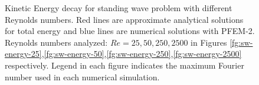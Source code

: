 \begin{figure}[h]
{    }
   \caption{Kinetic Energy decay for standing wave problem with different Reynolds numbers. Red lines are approximate analytical solutions for total energy and blue lines are numerical solutions with PFEM-2. Reynolds numbers analyzed: $Re=25,50,250,2500$ in Figures \ref{fg:sw-energy-25},\ref{fg:sw-energy-50},\ref{fg:sw-energy-250},\ref{fg:sw-energy-2500} respectively. Legend in each figure indicates the maximum Fourier number used in each numerical simulation.}
   \label{fg:sw-energy}
\end{figure}
